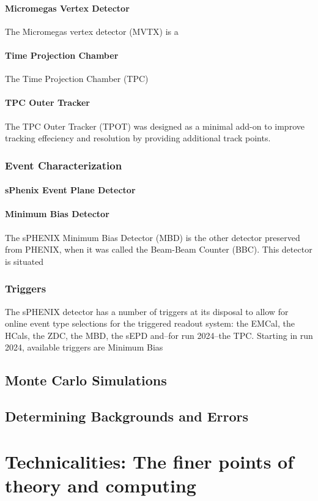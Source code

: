 \documentclass[letterpaper, 12pt, oneside]{book}
\theoremstyle{definition}
\begin{document}
	\subsection{Micromegas Vertex Detector}
	The Micromegas vertex detector (MVTX) is a 
	\subsection{Time Projection Chamber}
	The Time Projection Chamber (TPC) 
	\subsection{TPC Outer Tracker}
	The TPC Outer Tracker (TPOT) was designed as a minimal add-on to improve tracking effeciency and resolution by providing additional track points. 
\section{Event Characterization}
	\subsection{sPhenix Event Plane Detector}
	\subsection{Minimum Bias Detector}
	The sPHENIX Minimum Bias Detector (MBD) is the other detector preserved from PHENIX, when it was called the Beam-Beam Counter (BBC). 
	This detector is situated  
\section{Triggers}
	The sPHENIX detector has a number of triggers at its disposal to allow for online event type selections for the triggered readout system: the EMCal, the HCals, the ZDC, the MBD, the sEPD and--for run 2024--the TPC.
	Starting in run 2024, available triggers are Minimum Bias 
\chapter{Monte Carlo Simulations}
\chapter{Determining Backgrounds and Errors}
\part{Technicalities: The finer points of theory and computing}
\end{document}
